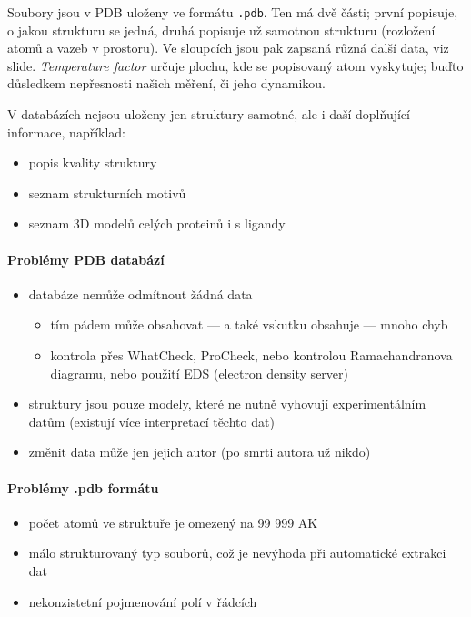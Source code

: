 \documentclass[DIV=8]{scrreprt}
\newcommand{\inlinecode}{\texttt}
\begin{document}
Soubory jsou v PDB uloženy ve formátu \inlinecode{.pdb}. Ten má dvě části; první popisuje, o jakou strukturu se jedná, druhá popisuje už samotnou strukturu (rozložení atomů a vazeb v prostoru). Ve sloupcích jsou pak zapsaná různá další data, viz slide. \emph{Temperature factor} určuje plochu, kde se popisovaný atom vyskytuje; buďto důsledkem nepřesnosti našich měření, či jeho dynamikou.

V databázích nejsou uloženy jen struktury samotné, ale i daší doplňující informace, například:
\begin{itemize}[nosep]
    \item popis kvality struktury
    \item seznam strukturních motivů
    \item seznam 3D modelů celých proteinů i s ligandy
\end{itemize}



\paragraph{Problémy PDB databází}
\begin{itemize}[nosep]
    \item databáze nemůže odmítnout žádná data
\begin{itemize}[nosep]
    \item tím pádem může obsahovat --- a také vskutku obsahuje --- mnoho chyb
    \item kontrola přes WhatCheck, ProCheck, nebo kontrolou Ramachandranova diagramu, nebo použití EDS (electron density server)
\end{itemize}

    \item struktury jsou pouze modely, které ne nutně vyhovují experimentálním datům (existují více interpretací těchto dat)
    \item změnit data může jen jejich autor (po smrti autora už nikdo)
\end{itemize}



\paragraph{Problémy .pdb formátu }
\begin{itemize}[nosep]
    \item počet atomů ve struktuře je omezený na 99 999 AK
    \item málo strukturovaný typ souborů, což je nevýhoda při automatické extrakci dat
    \item nekonzistetní pojmenování polí v řádcích
\end{itemize}
\end{document}

